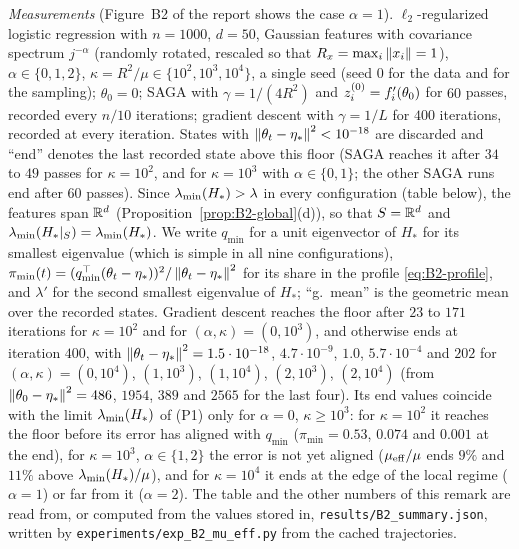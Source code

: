 \begin{remark}\label{rem:B2-P2-outcome}
\emph{Measurements} (Figure~B2 of the report shows the case ${\alpha=1}$). $\ell_2$-regularized logistic regression with
$n=1000$, $d=50$, Gaussian features with covariance spectrum $j^{-\alpha}$ (randomly rotated, rescaled so that
$R_x=\max_i\left\|x_i\right\|=1$), $\alpha\in\{0,1,2\}$, $\kappa=R^2/\mu\in\{10^2,10^3,10^4\}$, a single seed (seed $0$ for the data
and for the sampling); $\theta_0=0$; SAGA with $\gamma=1/(4R^2)$ and $z_i^{(0)}=f'_i(\theta_0)$ for $60$ passes, recorded every
$n/10$ iterations; gradient descent with $\gamma=1/L$ for $400$ iterations, recorded at every iteration. States with
$\left\|\theta_t-\eta_\ast\right\|^2<10^{-18}$ are discarded and ``end'' denotes the last recorded state above this floor (SAGA
reaches it after $34$ to $49$ passes for $\kappa=10^2$, and for $\kappa=10^3$ with $\alpha\in\{0,1\}$; the other SAGA runs
end after $60$ passes). Since $\lambda_{\min}(H_\ast)>\lambda$ in every configuration (table below), the features span $\mathbb{R}^d$
(Proposition~\ref{prop:B2-global}(d)), so that $S=\mathbb{R}^d$ and $\lambda_{\min}(H_\ast|_S)=\lambda_{\min}(H_\ast)$. We write $q_{\min}$ for a unit
eigenvector of $H_\ast$ for its smallest eigenvalue (which is simple in all nine configurations),
$\pi_{\min}(t)=(q_{\min}^\top(\theta_t-\eta_\ast))^2/\left\|\theta_t-\eta_\ast\right\|^2$ for its share in the profile
\eqref{eq:B2-profile}, and $\lambda'$ for the second smallest eigenvalue of $H_\ast$; ``g.\ mean'' is the geometric mean over
the recorded states. Gradient descent reaches the floor after $23$ to $171$ iterations for $\kappa=10^2$ and for
$(\alpha,\kappa)=(0,10^3)$, and otherwise ends at iteration $400$, with $\left\|\theta_t-\eta_\ast\right\|^2=1.5\cdot10^{-18}$,
$4.7\cdot10^{-9}$, $1.0$, $5.7\cdot10^{-4}$ and $202$ for $(\alpha,\kappa)=(0,10^4)$, $(1,10^3)$, $(1,10^4)$, $(2,10^3)$,
$(2,10^4)$ (from $\left\|\theta_0-\eta_\ast\right\|^2=486$, $1954$, $389$ and $2565$ for the last four). Its end values coincide
with the limit $\lambda_{\min}(H_\ast)$ of (P1) only for $\alpha=0$, $\kappa\ge10^3$: for $\kappa=10^2$ it reaches the
floor before its error has aligned with $q_{\min}$ ($\pi_{\min}=0.53$, $0.074$ and $0.001$ at the end), for $\kappa=10^3$,
$\alpha\in\{1,2\}$ the error is not yet aligned ($\mu_{\mathrm{eff}}/\mu$ ends $9\%$ and $11\%$ above $\lambda_{\min}(H_\ast)/\mu$), and for
$\kappa=10^4$ it ends at the edge of the local regime ($\alpha=1$) or far from it ($\alpha=2$). The table and the other
numbers of this remark are read from, or computed from the values stored in, \texttt{results/B2\_summary.json}, written
by \texttt{experiments/exp\_B2\_mu\_eff.py} from the cached trajectories.

\end{remark}
